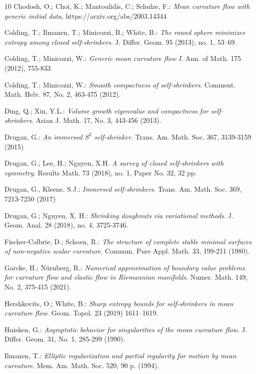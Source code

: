 \documentclass[12pt]{amsart}
\numberwithin{equation}{section}
\theoremstyle{remark}
\begin{document}
\begin{thebibliography}{10}
		Chodosh, O.; Choi, K.; Mantoulidis, C.; Schulze, F.:
		{\sl Mean curvature flow with generic initial data}, https://arxiv.org/abs/2003.14344
		
		Colding, T.; Ilmanen, T.; Minicozzi, B.; White, B.:
		{\sl The round sphere minimizes entropy among closed self-shrinkers}. J. Differ. Geom. 95 (2013), no. 1, 53–69.
		
		Colding, T.; Minicozzi, W.: {\sl Generic mean curvature flow I}. Ann. of Math. 175 (2012), 755-833
		
		Colding, T.; Minicozzi, W.: {\sl Smooth compactness of self-shrinkers}. Comment. Math. Helv. 87, No. 2, 463-475 (2012).
		
		Ding, Q.; Xin, Y.L.:
		{\sl Volume growth eigenvalue and compactness for self-shrinkers}. Asian J. Math. 17, No. 3, 443-456 (2013).
		
		Drugan, G.: 
		{\sl An immersed $S^2$ self-shrinker}. Trans. Am. Math. Soc. 367, 3139-3159 (2015)
		
		Drugan, G.; Lee, H.; Nguyen, X.H.
		{\sl A survey of closed self-shrinkers with symmetry}. Results Math. 73 (2018), no. 1, Paper No. 32, 32 pp.
		
		Drugan, G., Kleene, S.J.: 
		{\sl Immersed self-shrinkers}. Trans. Am. Math. Soc. 369, 7213-7250 (2017)
		
		Drugan, G.; Nguyen, X. H.:
		{\sl Shrinking doughnuts via variational methods}. J. Geom. Anal. 28 (2018), no. 4, 3725-3746.
		
		Fischer-Colbrie, D.; Schoen, R.:
		{\sl The structure of complete stable minimal surfaces of non-negative scalar curvature}. Commun. Pure Appl. Math. 33, 199-211 (1980).
		
		Garcke, H.; Nürnberg, R.:
		{\sl Numerical approximation of boundary value problems for curvature flow and elastic flow in Riemannian manifolds}. Numer. Math. 149, No. 2, 375-415 (2021).
		
		Hershkovits, O.; White, B.:
		{\sl Sharp entropy bounds for self-shrinkers in mean curvature flow}. Geom. Topol. 23 (2019) 1611--1619.
		
		Huisken, G.:
		{\sl Asymptotic behavior for singularities of the mean curvature flow}. J. Differ. Geom. 31, No. 1, 285-299 (1990).
		
		Ilmanen, T.:
		{\sl Elliptic regularization and partial regularity for motion by mean curvature}. Mem. Am. Math. Soc. 520, 90 p. (1994).
		

\end{thebibliography}
\end{document}
